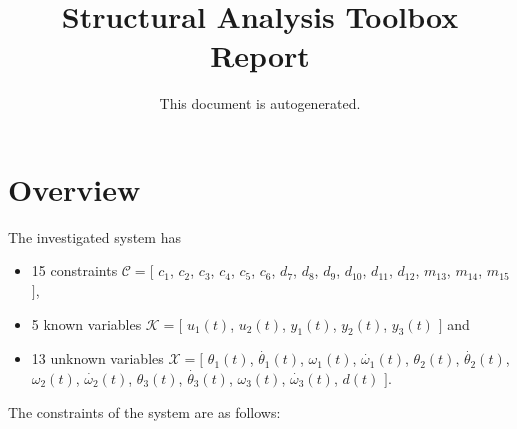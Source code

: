 \documentclass[a4,11pt]{article}
\title{Structural Analysis Toolbox Report}
\author{This document is autogenerated.}
\begin{document}
\maketitle
\section{Overview}
The investigated system has
\begin{itemize}
	\item 15 constraints $\mathcal{C} = [$ $c_1$, $c_2$, $c_3$, $c_4$, $c_5$, $c_6$, $d_7$, $d_8$, $d_9$, $d_{10}$, $d_{11}$, $d_{12}$, $m_{13}$, $m_{14}$, $m_{15}$ $]$,
	\item 5 known variables $\mathcal{K} = [$ $u_1\left(t\right)$, $u_2\left(t\right)$, $y_1\left(t\right)$, $y_2\left(t\right)$, $y_3\left(t\right)$ $]$ and
	\item 13 unknown variables $\mathcal{X} = [$ $\theta_1\left(t\right)$, $\dot{\theta_1}\left(t\right)$, $\omega_1\left(t\right)$, $\dot{\omega_1}\left(t\right)$, $\theta_2\left(t\right)$, $\dot{\theta_2}\left(t\right)$, $\omega_2\left(t\right)$, $\dot{\omega_2}\left(t\right)$, $\theta_3\left(t\right)$, $\dot{\theta_3}\left(t\right)$, $\omega_3\left(t\right)$, $\dot{\omega_3}\left(t\right)$, $d\left(t\right)$ $]$.
\end{itemize}
The constraints of the system are as follows:
\end{document}
